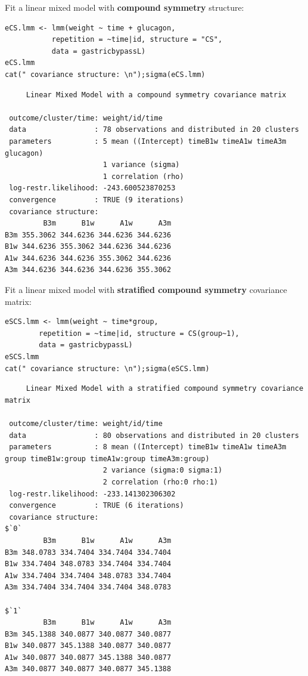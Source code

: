 \documentclass[12pt]{article}
\begin{document}
\clearpage

Fit a linear mixed model with \textbf{compound symmetry} structure:
\lstset{language=r,label= ,caption= ,captionpos=b,numbers=none}
\begin{lstlisting}
eCS.lmm <- lmm(weight ~ time + glucagon,
	       repetition = ~time|id, structure = "CS",
	       data = gastricbypassL)
eCS.lmm
cat(" covariance structure: \n");sigma(eCS.lmm)
\end{lstlisting}

\begin{verbatim}
     Linear Mixed Model with a compound symmetry covariance matrix 

 outcome/cluster/time: weight/id/time 
 data                : 78 observations and distributed in 20 clusters 
 parameters          : 5 mean ((Intercept) timeB1w timeA1w timeA3m glucagon) 
                       1 variance (sigma) 
                       1 correlation (rho) 
 log-restr.likelihood: -243.600523870253 
 convergence         : TRUE (9 iterations)
 covariance structure: 
         B3m      B1w      A1w      A3m
B3m 355.3062 344.6236 344.6236 344.6236
B1w 344.6236 355.3062 344.6236 344.6236
A1w 344.6236 344.6236 355.3062 344.6236
A3m 344.6236 344.6236 344.6236 355.3062
\end{verbatim}

\clearpage

\noindent Fit a linear mixed model with \textbf{stratified compound symmetry} covariance matrix:

\lstset{language=r,label= ,caption= ,captionpos=b,numbers=none}
\begin{lstlisting}
eSCS.lmm <- lmm(weight ~ time*group,
		repetition = ~time|id, structure = CS(group~1),
		data = gastricbypassL)
eSCS.lmm
cat(" covariance structure: \n");sigma(eSCS.lmm)
\end{lstlisting}

\begin{verbatim}
     Linear Mixed Model with a stratified compound symmetry covariance matrix 

 outcome/cluster/time: weight/id/time 
 data                : 80 observations and distributed in 20 clusters 
 parameters          : 8 mean ((Intercept) timeB1w timeA1w timeA3m group timeB1w:group timeA1w:group timeA3m:group) 
                       2 variance (sigma:0 sigma:1) 
                       2 correlation (rho:0 rho:1) 
 log-restr.likelihood: -233.141302306302 
 convergence         : TRUE (6 iterations)
 covariance structure: 
$`0`
         B3m      B1w      A1w      A3m
B3m 348.0783 334.7404 334.7404 334.7404
B1w 334.7404 348.0783 334.7404 334.7404
A1w 334.7404 334.7404 348.0783 334.7404
A3m 334.7404 334.7404 334.7404 348.0783

$`1`
         B3m      B1w      A1w      A3m
B3m 345.1388 340.0877 340.0877 340.0877
B1w 340.0877 345.1388 340.0877 340.0877
A1w 340.0877 340.0877 345.1388 340.0877
A3m 340.0877 340.0877 340.0877 345.1388
\end{verbatim}
\end{document}
